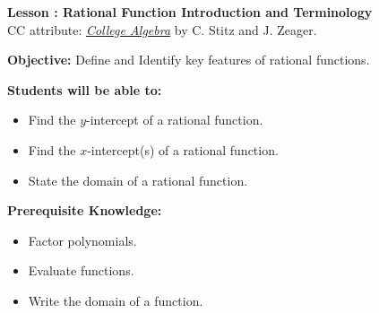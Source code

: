 \documentclass[12pt]{article}
\theoremstyle{definition}
\begin{document}
{\bf \large Lesson : Rational Function Introduction and Terminology }
\\ CC attribute: \href{http://www.stitz-zeager.com}{\it{College Algebra}} by C. Stitz and J. Zeager. 
\hfill \doclicenseImage[imagewidth=5em]\\
\par
{\bf Objective:} Define and Identify key features of rational functions.\\
\par
{\bf Students will be able to:}
\begin{itemize}
	\item Find the $y$-intercept of a rational function.
	\item Find the $x$-intercept(s) of a rational function.
	\item State the domain of a rational function.
\end{itemize}
{\bf Prerequisite Knowledge:}
\begin{itemize}
	\item Factor polynomials.
	\item Evaluate functions.
	\item Write the domain of a function.
\end{itemize}
\hrulefill
\end{document}
